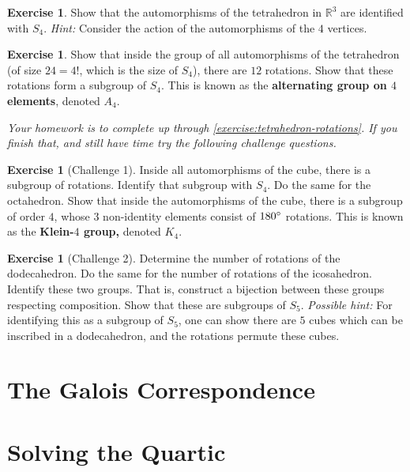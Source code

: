 \documentclass[reqno, 12pt, letter]{article}
\theoremstyle{plain}
\theoremstyle{definition}
\newtheorem{exercise}[theorem]{Exercise}
\theoremstyle{remark}
\numberwithin{equation}{section}
\newcommand\br{{\mathbb R}}
\begin{document}
\begin{exercise}
	\label{exercise:}
	Show that the automorphisms of the tetrahedron in $\br^3$ are identified with $S_4$. {\it Hint:} Consider the action of the automorphisms of the $4$ vertices.
\end{exercise}
\begin{exercise}
	\label{exercise:tetrahedron-rotations}
	Show that inside the group of all automorphisms of the tetrahedron (of size $24 = 4!$, which is the size of $S_4$), there are $12$ rotations.
	Show that these rotations form a subgroup of $S_4$. This is known as the {\bf alternating group on $4$ elements}, denoted $A_4$.
\end{exercise}

{\it Your homework is to complete up through \autoref{exercise:tetrahedron-rotations}. If you finish that, and still have time try the following challenge questions.}

\begin{exercise}[Challenge 1]
	\label{exercise:}
	Inside all automorphisms of the cube, there is a subgroup of rotations. Identify that subgroup with $S_4$.
	Do the same for the octahedron.
	Show that inside the automorphisms of the cube, there is a subgroup of order $4$, whose $3$ non-identity elements consist of $180 \degree$ rotations.
	This is known as the {\bf Klein-$4$ group,} denoted $K_4$.
\end{exercise}
\begin{exercise}[Challenge 2]
	\label{exercise:}
	Determine the number of rotations of the dodecahedron. Do the same for the number of rotations of the icosahedron.
	Identify these two groups. That is, construct a bijection between these groups respecting composition.
	Show that these are subgroups of $S_5$. 
	{\it Possible hint:} For identifying this as a subgroup of $S_5$,
	one can show there are $5$ cubes which can be inscribed in a dodecahedron, and the rotations permute these cubes.
\end{exercise}

\newpage
\section{The Galois Correspondence}

\newpage
\section{Solving the Quartic}



\end{document}
